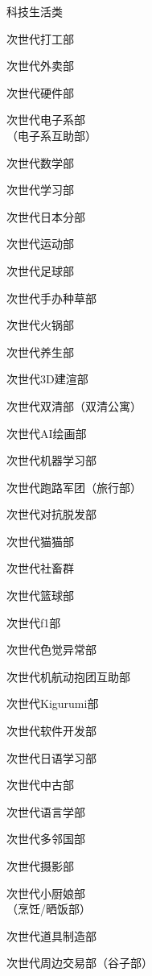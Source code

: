 \begin{multicols}{3}
    \begin{categorysection}{科技生活类}
        \item 次世代打工部
        \item 次世代外卖部
        \item 次世代硬件部
        \item 次世代电子系部\\（电子系互助部）
        \item 次世代数学部
        \item 次世代学习部
        \item 次世代日本分部
        \item 次世代运动部
        \item 次世代足球部
        \item 次世代手办种草部
        \item 次世代火锅部
        \item 次世代养生部
        \item 次世代3D建渲部
        \item 次世代双清部（双清公寓）
        \item 次世代AI绘画部
        \item 次世代机器学习部
        \item 次世代跑路军团（旅行部）
        \item 次世代对抗脱发部
        \item 次世代猫猫部
        \item 次世代社畜群
        \item 次世代篮球部
        \item 次世代f1部
        \item 次世代色觉异常部
        \item 次世代机航动抱团互助部
        \item 次世代Kigurumi部
        \item 次世代软件开发部
        \item 次世代日语学习部
        \item 次世代中古部
        \item 次世代语言学部
        \item 次世代多邻国部
        \item 次世代摄影部
        \item 次世代小厨娘部\\（烹饪/晒饭部）
        \item 次世代道具制造部
        \item 次世代周边交易部（谷子部）
    \end{categorysection}

\end{multicols}
\newpage


